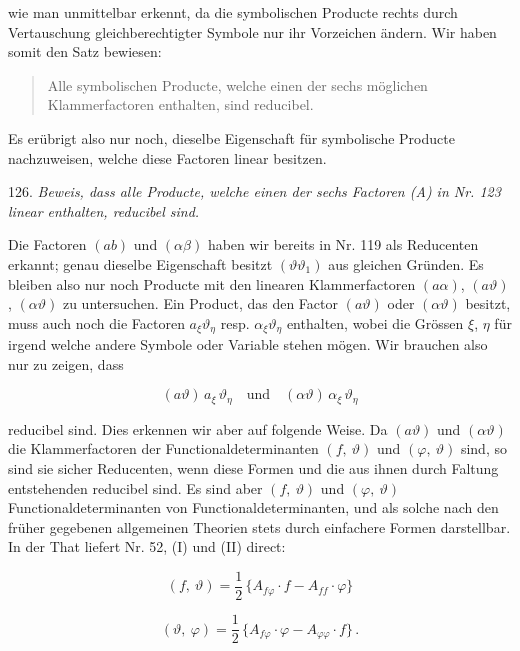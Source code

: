 wie man unmittelbar erkennt, da die symbolischen Producte rechts
durch Vertauschung gleichberechtigter Symbole nur ihr Vorzeichen
ändern. Wir haben somit den Satz bewiesen:

\begin{quote}
\glqq Alle symbolischen Producte, welche einen der sechs möglichen
Klammerfactoren  enthalten, sind reducibel.\grqq{}
\end{quote}

Es erübrigt also nur noch, dieselbe Eigenschaft für symbolische
Producte nachzuweisen, welche diese Factoren linear besitzen.

126. \textit{Beweis, dass alle Producte, welche einen der sechs Factoren (A)
in Nr. 123 linear enthalten, reducibel sind.}



Die Factoren $(ab)$ und $(\alpha\beta)$ haben wir bereits in Nr. 119 als Reducenten
erkannt; genau dieselbe Eigenschaft besitzt $(\vartheta\vartheta_1)$ aus gleichen Gründen.
Es bleiben also nur noch Producte mit den linearen Klammerfactoren
$(a\alpha)$, $(a\vartheta)$, $(\alpha\vartheta)$ zu untersuchen. Ein Product, das den Factor $(a\vartheta)$
oder $(\alpha\vartheta)$ besitzt, muss auch noch die Factoren $a_\xi\vartheta_\eta$ resp.
$\alpha_\xi\vartheta_\eta$ enthalten, wobei die Grössen $\xi$, $\eta$ für irgend welche andere
Symbole oder Variable stehen mögen. Wir brauchen also nur zu zeigen, dass

\[
(a\vartheta)\,a_\xi\,\vartheta_\eta \quad \text{und} \quad (\alpha\vartheta)\,\alpha_\xi\,\vartheta_\eta
\]

reducibel sind. Dies erkennen wir aber auf folgende Weise. Da $(a\vartheta)$
und $(\alpha\vartheta)$ die Klammerfactoren der Functionaldeterminanten $(f,\ \vartheta)$
und $(\varphi,\ \vartheta)$ sind, so sind sie sicher Reducenten, wenn diese Formen
und die aus ihnen durch Faltung entstehenden reducibel sind. Es
sind aber $(f,\ \vartheta)$ und $(\varphi,\ \vartheta)$ Functionaldeterminanten von Functionaldeterminanten, und als solche nach den früher gegebenen allgemeinen
Theorien stets durch einfachere Formen darstellbar. In der That
liefert Nr. 52, (I) und (II) direct:

\[
(f,\ \vartheta) = \frac{1}{2}\,\{A_{f\varphi}\cdot f - A_{ff}\cdot\varphi\}
\]

\[
(\vartheta,\ \varphi) = \frac{1}{2}\,\{A_{f\varphi}\cdot\varphi - A_{\varphi\varphi}\cdot f\}\,.
\]

